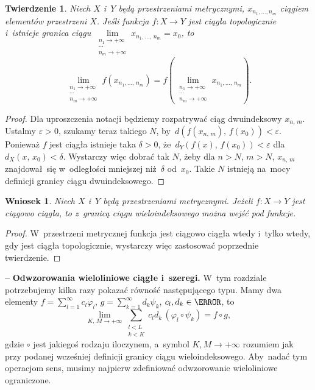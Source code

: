 \documentclass[a4paper,11pt]{article}
\newtheorem{twr}{Twierdzenie} %
\newtheorem{wni}{Wniosek}
\newcommand{\spaceFour}{0.5em}
\newcommand{\ld}{\ldots}
\newcommand{\tb}{\textbf}
\newcommand{\noi}{\noindent}
\newcommand{\ld}{\ldots}
\newcommand{\tb}{\textbf}
\newcommand{\noi}{\noindent}
\newcommand{\start}{\noi \tb{--} {}}
\newcommand{\ra}{\rightarrow}
\newcommand{\wtw}{wtedy i~tylko wtedy}
\newcommand{\del}{\delta}
\newcommand{\veps}{\varepsilon}
\newcommand{\vp}{\varphi}
\newcommand{\Lim}{\lim\limits}
\newcommand{\Sum}{\sum\limits}
\newcommand{\ci}{\circ}
\begin{document}
\begin{twr}
  Niech $X$ i~$Y$ będą przestrzeniami metrycznymi,
  $x_{ n_{ 1 }, \ld, n_{ m } }$ ciągiem elementów przestrzeni $X$.
  Jeśli funkcja $f: X \ra Y$ jest ciągła topologicznie i~istnieje
  granica ciągu
  $\Lim_{ \substack{ n_{ 1 } \ra +\infty \\ \cdots \\ n_{ m } \ra
      +\infty } } x_{ n_{ 1 }, \ld, \, n_{ m } } = x_{ 0 }$, to
  \begin{equation}
    \Lim_{ \substack{ n_{ 1 } \ra +\infty \\ \cdots \\  n_{ m } \ra +\infty } }
    f( x_{ n_{ 1 }, \ld, \, n_{ m } } )
    = f( \Lim_{ \substack{ n_{ 1 } \ra +\infty \\ \cdots \\ n_{ m } \ra
        +\infty } } x_{ n_{ 1 }, \ld, \, n_{ m } } ).
  \end{equation}
\end{twr}

\begin{proof}
  Dla uproszczenia notacji będziemy rozpatrywać ciąg dwuindeksowy
  $x_{ n, \, m }$. Ustalmy $\veps > 0$, szukamy teraz takiego $N$,
  by~$d( f( x_{ n, \, m } ),\, f( x_{ 0 } ) ) < \veps$. Ponieważ $f$
  jest ciągła istnieje taka $\del > 0$, \linebreak
  że~$d_{ Y }( f( x ),\, f( x_{ 0 } ) ) < \veps$
  dla~$d_{ X }( x,\, x_{ 0 } ) < \del$. Wystarczy więc dobrać tak $N$,
  żeby dla $n > N$, $m > N$, $x_{ n, \, m }$ znajdował~się
  w~odległości mniejszej niż~$\del$ od~$x_{ 0 }$. Takie $N$ istnieją
  na~mocy definicji granicy ciągu dwuindeksowego.
\end{proof}

\begin{wni}
  Niech $X$ i~$Y$ będą przestrzeniami metrycznymi. Jeżeli $f: X \ra Y$
  jest ciągowo ciągła, to z~granicą ciągu wieloindeksowego można wejść
  pod funkcje.
\end{wni}

\begin{proof}
  W~przestrzeni metrycznej funkcja jest ciągowo ciągła \wtw, gdy jest
  ciągła topologicznie, wystarczy więc zastosować poprzednie
  twierdzenie.
\end{proof}

\vspace{\spaceFour}


\start \tb{Odwzorowania wieloliniowe ciągłe i~szeregi.} W~tym
rozdziale potrzebujemy kilka razy pokazać równość następującego typu.
Mamy dwa elementy $f = \sum_{ l = 1 }^{ \infty } c_{ l } \vp_{ l }$,
$g = \sum_{ k = 1 }^{ \infty } d_{ k } \psi_{ k }$,
$c_{ l }, d_{ k } \in \C$, to
\begin{equation*}
  \Lim_{ K,\, M \ra +\infty } \Sum_{ \substack{ l < L \\ k < K } }
  c_{ l } d_{ k } \, (\vp_{ l } \ci \psi_{ k } ) = f \ci g,
\end{equation*}
gdzie $\ci$ jest jakiegoś rodzaju iloczynem, a~symbol
$K, M \ra +\infty$ rozumiem jak przy podanej wcześniej definicji
granicy ciągu wieloindeksowego. Aby~nadać tym operacjom sens, musimy
najpierw zdefiniować odwzorowanie wieloliniowe ograniczone.
\end{document}
